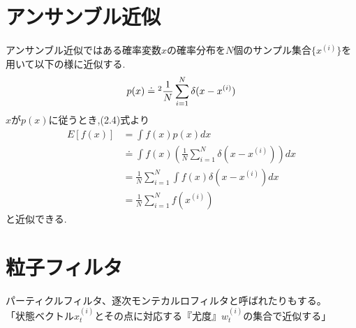 \documentclass[dvipdfmx,uplatex,10pt]{jsarticle}
\begin{document}
\section{アンサンブル近似}
アンサンブル近似ではある確率変数$x$の確率分布を$N$個のサンプル集合$\{x^{(i)}\}$を用いて以下の様に近似する.
\begin{equation}
  p(x) \doteq \footnotemark[2] \frac{1}{N}\sum_{i=1}^{N}\delta(x-x^{(i)})
\end{equation}
$x$が$p(x)$に従うとき,(2.4)式より
\begin{align}
  E[f(x)]
  &=\int f(x)p(x)dx\nonumber\\
  &\doteq \int f(x)\left(\frac{1}{N}\sum_{i=1}^{N}\delta(x-x^{(i)})\right)dx \nonumber\\ 
  &=\frac{1}{N}\sum_{i=1}^{N}\int f(x)\delta(x-x^{(i)})dx\nonumber \\
  &=\frac{1}{N}\sum_{i=1}^{N}f(x^{(i)})
\end{align}
と近似できる.
\section{粒子フィルタ}
パーティクルフィルタ、逐次モンテカルロフィルタと呼ばれたりもする。\\
「状態ベクトル$x_{t}^{(i)}$とその点に対応する『尤度』$w_{t}^{(i)}$の集合で近似する」\\
\end{document}
